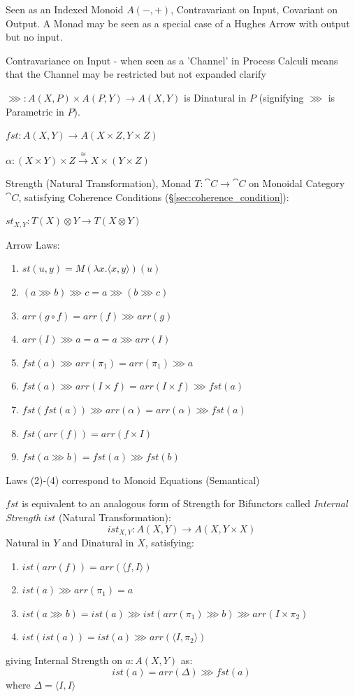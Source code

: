 Seen as an Indexed Monoid $A(-,+)$, Contravariant on Input, Covariant
on Output. A Monad may be seen as a special case of a Hughes Arrow
with output but no input.

Contravariance on Input - when seen as a 'Channel' in Process Calculi
means that the Channel may be restricted but not expanded %
clarify

$\ggg : A(X,P) \times A(P,Y) \rightarrow A(X,Y)$ is Dinatural in $P$
(signifying $\ggg$ is Parametric in $P$). \cite{jacobs-heunen-hasuo09}

$fst : A(X,Y) \rightarrow A(X \times Z, Y \times Z)$

$\alpha : (X \times Y) \times Z
\xrightarrow{\cong} X \times (Y \times Z)$

Strength (Natural Transformation), Monad $T : \cat{C} \rightarrow
\cat{C}$ on Monoidal Category $\cat{C}$, satisfying Coherence
Conditions (\S\ref{sec:coherence_condition}):

$st_{X,Y} : T(X) \otimes Y \rightarrow T(X \otimes Y)$

Arrow Laws:
\begin{enumerate}
  \item $st(u,y) = M(\lambda x.\langle x,y \rangle)(u)$
  \item $(a \ggg b) \ggg c = a \ggg (b \ggg c)$
  \item $arr (g \circ f) = arr(f) \ggg arr(g)$
  \item $arr(I) \ggg a = a = a \ggg arr(I)$
  \item $fst(a) \ggg arr(\pi_1) = arr(\pi_1) \ggg a$
  \item $fst(a) \ggg arr (I \times f) = arr (I \times f) \ggg fst(a)$
  \item $fst (fst(a)) \ggg arr(\alpha) = arr(\alpha) \ggg fst(a)$
  \item $fst (arr(f)) = arr (f \times I)$
  \item $fst (a \ggg b) = fst(a) \ggg fst(b)$
\end{enumerate}
Laws (2)-(4) correspond to Monoid Equations (Semantical)

$fst$ is equivalent to an analogous form of Strength for Bifunctors
called \emph{Internal Strength} $ist$ (Natural Transformation):
\[
  ist_{X,Y} : A(X,Y) \rightarrow A(X,Y \times X)
\]
Natural in $Y$ and Dinatural in $X$, satisfying:
\begin{enumerate}
  \item $ist(arr(f)) = arr(\langle f,I \rangle)$
  \item $ist(a) \ggg arr(\pi_1) = a$
  \item $ist(a \ggg b) = ist(a) \ggg ist(arr(\pi_1) \ggg b) \ggg arr(I
    \times \pi_2)$
  \item $ist(ist(a)) = ist(a) \ggg arr(\langle I, \pi_2 \rangle)$
\end{enumerate}
giving Internal Strength on $a : A(X,Y)$ as:
\[
  ist(a) = arr(\Delta) \ggg fst(a)
\]
where $\Delta = \langle I,I \rangle$


